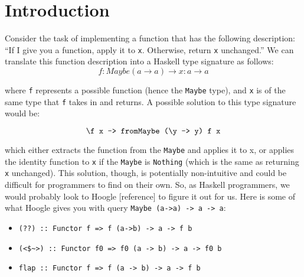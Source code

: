 \documentclass[acmsmall,nonacm]{acmart}
\begin{document}
\maketitle

\section{Introduction}


Consider the task of implementing a function that has the following 
description: “If I give you a function, apply it to \verb|x|. Otherwise, 
return \verb|x| unchanged.” We can translate this function description 
into a Haskell type signature as follows: 
\begin{equation}
  \label{query1}
  f:Maybe (a \to a) \to x:a \to a
\end{equation}

\noindent where \verb|f| represents a possible function (hence the \verb|Maybe| type), and 
\verb|x| is of the same type that \verb|f| takes in and returns. A possible 
solution to this type signature would be:

\begin{equation}
  \label{solution1}
  \verb|\f x -> fromMaybe (\y -> y) f x|
\end{equation}

\noindent which either extracts the function from the \verb|Maybe| and applies it to x, 
or applies the identity function to \verb|x| if the \verb|Maybe| is \verb|Nothing|
(which is the same as returning \verb|x| unchanged). 
This solution, though, is potentially non-intuitive and could be difficult 
for programmers to find on their own. So, as Haskell programmers, we would 
probably look to Hoogle [reference] to figure it out for us. Here is some 
of what Hoogle gives you with query \verb|Maybe (a->a) -> a -> a|:

\begin{itemize}
  \item \verb|(??) :: Functor f => f (a->b) -> a -> f b|
  \item \verb|(<$~>) :: Functor f0 => f0 (a -> b) -> a -> f0 b|
  \item \verb|flap :: Functor f => f (a -> b) -> a -> f b|
\end{itemize}

\end{document}

